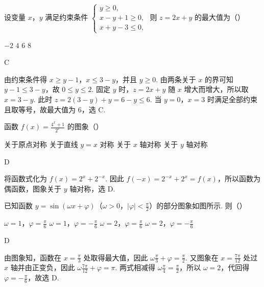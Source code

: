 \begin{problem}
设变量 \(x\)，\(y\) 满足约束条件 \(\begin{cases}
y \geqslant 0,\\
x - y + 1 \geqslant 0,\\
x + y - 3 \leqslant 0,
\end{cases}\) 则 \(z = 2x + y\) 的最大值为（\quad）

\choices
    {\(-2\)}
    {\(4\)}
    {\(6\)}
    {\(8\)}

\begin{answer}
C
\end{answer}

\begin{solution}
由约束条件得 \(x\geqslant y-1\)，\(x\leqslant 3-y\)，并且 \(y\geqslant0\). 由两条关于 \(x\) 的界可知 \(y-1\leqslant3-y\)，故 \(0\leqslant y\leqslant2\). 固定 \(y\) 时，\(z=2x+y\) 随 \(x\) 增大而增大，所以取 \(x=3-y\). 此时
\(z=2(3-y)+y=6-y\leqslant6\). 当 \(y=0\)，\(x=3\) 时满足全部约束且取等号，故最大值为 \(6\)，选 C.
\end{solution}
\end{problem}

\begin{problem}
函数 \( f(x) = \frac{4^x + 1}{2^x} \) 的图象（\quad）

\choices
    {关于原点对称}
    {关于直线 \( y = x \) 对称}
    {关于 \(x\) 轴对称}
    {关于 \(y\) 轴对称}

\begin{answer}
D
\end{answer}

\begin{solution}
将函数式化为 \(f(x)=2^x+2^{-x}\). 因此 \(f(-x)=2^{-x}+2^x=f(x)\)，所以函数为偶函数，图象关于 \(y\) 轴对称，选 D.
\end{solution}
\end{problem}

\begin{problem}
已知函数 \(y = \sin\left(\omega x + \varphi\right)\)（\(\omega > 0\)，\(|\varphi| < \frac{\pi}{2}\)）的部分图象如图所示. 则（\quad）


\choices
    {\(\omega = 1\)，\(\varphi = \frac{\pi}{6}\)}
    {\(\omega = 1\)，\(\varphi = -\frac{\pi}{6}\)}
    {\(\omega = 2\)，\(\varphi = \frac{\pi}{6}\)}
    {\(\omega = 2\)，\(\varphi = -\frac{\pi}{6}\)}

\begin{answer}
D
\end{answer}

\begin{solution}
由图象知，函数在 \(x=\frac{\pi}{3}\) 处取得最大值，因此 \(\omega\frac{\pi}{3}+\varphi=\frac{\pi}{2}\). 又图象在 \(x=\frac{7\pi}{12}\) 处过 \(x\) 轴并由正变负，因此 \(\omega\frac{7\pi}{12}+\varphi=\pi\). 两式相减得 \(\omega\frac{\pi}{4}=\frac{\pi}{2}\)，所以 \(\omega=2\)，代回得 \(\varphi=-\frac{\pi}{6}\)，故选 D.
\end{solution}
\end{problem}

